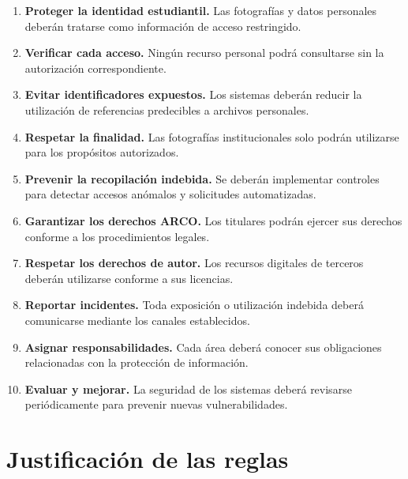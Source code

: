 \documentclass[12pt]{article}
\begin{document}
\begin{enumerate}[label=\textbf{\arabic*.}]

    \item \textbf{Proteger la identidad estudiantil.}
    Las fotografías y datos personales
    deberán tratarse como información
    de acceso restringido.

    \item \textbf{Verificar cada acceso.}
    Ningún recurso personal podrá
    consultarse sin la autorización
    correspondiente.

    \item \textbf{Evitar identificadores expuestos.}
    Los sistemas deberán reducir
    la utilización de referencias
    predecibles a archivos personales.

    \item \textbf{Respetar la finalidad.}
    Las fotografías institucionales
    solo podrán utilizarse para
    los propósitos autorizados.

    \item \textbf{Prevenir la recopilación indebida.}
    Se deberán implementar controles
    para detectar accesos anómalos
    y solicitudes automatizadas.

    \item \textbf{Garantizar los derechos ARCO.}
    Los titulares podrán ejercer
    sus derechos conforme a
    los procedimientos legales.

    \item \textbf{Respetar los derechos de autor.}
    Los recursos digitales de
    terceros deberán utilizarse
    conforme a sus licencias.

    \item \textbf{Reportar incidentes.}
    Toda exposición o utilización
    indebida deberá comunicarse
    mediante los canales establecidos.

    \item \textbf{Asignar responsabilidades.}
    Cada área deberá conocer
    sus obligaciones relacionadas
    con la protección de información.

    \item \textbf{Evaluar y mejorar.}
    La seguridad de los sistemas
    deberá revisarse periódicamente
    para prevenir nuevas vulnerabilidades.

\end{enumerate}

\section{Justificación de las reglas}
\end{document}
